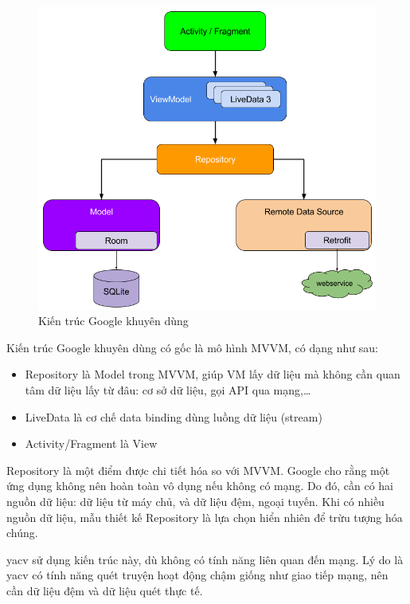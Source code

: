 \documentclass[../../thesis]{subfiles}
\begin{document}
\begin{figure}
    \centering
    \vspace*{-6mm}
    \includegraphics[width=\linewidth]{../images/final-architecture.png}
    \vspace*{-10mm}
    \caption{Kiến trúc Google khuyên dùng \cite{GOOGL_APP_ARCH}}
    \label{fig:google-recom-arch}
\end{figure}

Kiến trúc Google khuyên dùng có gốc là mô hình MVVM, có dạng như sau:

\begin{itemize}
    \item
        Repository là Model trong MVVM, giúp VM lấy dữ liệu mà không cần quan
        tâm dữ liệu lấy từ đâu: cơ sở dữ liệu, gọi API qua mạng,\ldots
    \item
        LiveData là cơ chế data binding dùng luồng dữ liệu (stream)
    \item
        Activity/Fragment là View
\end{itemize}

Repository là một điểm được chi tiết hóa so với MVVM. Google cho rằng một ứng
dụng không nên hoàn toàn vô dụng nếu không có mạng. Do đó, cần có hai nguồn dữ
liệu: dữ liệu từ máy chủ, và dữ liệu đệm, ngoại tuyến. Khi có nhiều nguồn dữ
liệu, mẫu thiết kế Repository là lựa chọn hiển nhiên để trừu tượng hóa chúng.

yacv sử dụng kiến trúc này, dù không có tính năng liên quan đến mạng. Lý do là
yacv có tính năng quét truyện hoạt động chậm giống như giao tiếp mạng, nên cần
dữ liệu đệm và dữ liệu quét thực tế.
\end{document}
